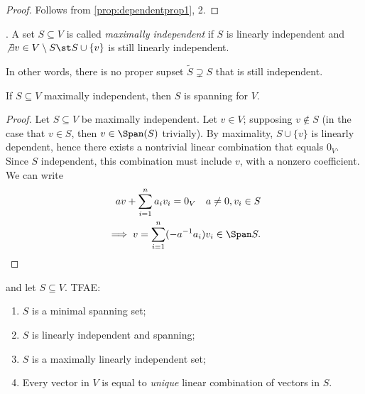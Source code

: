 \begin{proof}
    Follows from \cref{prop:dependentprop1}, 2.
\end{proof}

\begin{definition}
     . A set $S \subseteq V$ is called \emph{maximally independent} if $S$ is linearly independent and $\not \exists v \in V \setminus S \st S \cup \{v\}$ is still linearly independent.
    
    In other words, there is no proper supset $\tilde{S} \supsetneq S$ that is still independent.
\end{definition}

\begin{lemma}\label{lemma:maximallyisspanning}
    If $S \subseteq V$ maximally independent, then $S$ is spanning for $V$.
\end{lemma}

\begin{proof}
    Let $S \subseteq V$ be maximally independent. Let $v \in V$; supposing $v \notin S$ (in the case that $v \in S$, then $v \in \Span (S)$ trivially). By maximality, $S \cup \{v\}$ is linearly dependent, hence there exists a nontrivial linear combination that equals $0_V$. Since $S$ independent, this combination must include $v$, with a nonzero coefficient. We can write \begin{align*}
        a v + \sum_{i=1}^{n} a_i v_i = 0_V \quad a \neq 0, v_i \in S\\
        \implies v = \sum_{i=1}^{n} (-a^{-1}a_i)v_i \in \Span S.
    \end{align*}
\end{proof}

\begin{theorem}
     and let $S \subseteq V$. TFAE: \begin{enumerate}
        \item $S$ is a minimal spanning set;
        \item $S$ is linearly independent and spanning;
        \item $S$ is a maximally linearly independent set;
        \item Every vector in $V$ is equal to \emph{unique} linear combination of vectors in $S$.
    \end{enumerate}
\end{theorem}